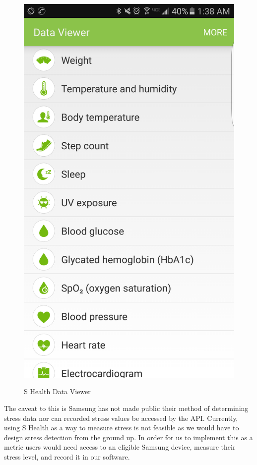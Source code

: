 \documentclass[a4paper,10pt]{article}
\begin{document}
\begin{figure}[H]
\begin{minipage}{0.45\textwidth}
		\includegraphics[scale = 0.07]{dataViewerAPK.png}
		\label{dataViewerAPK}
		\caption{S Health Data Viewer}
	\end{minipage}
\end{figure}
	
The caveat to this is Samsung has not made public their method of determining stress data nor can recorded stress values be accessed by the API. Currently, using S Health as a way to measure stress is not feasible as we would have to design stress detection from the ground up. In order for us to implement this as a metric users would need access to an eligible Samsung device, measure their stress level, and record it in our software.
\end{document}
